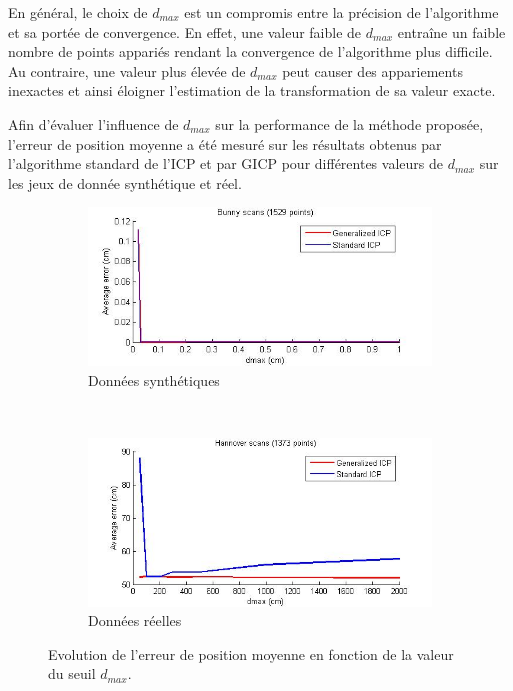 En général, le choix de $d_{max}$ est un compromis entre la précision de l'algorithme et sa portée de convergence. En effet, une valeur faible de $d_{max}$ entraîne un faible nombre de points appariés rendant la convergence de l'algorithme plus difficile. Au contraire, une valeur plus élevée de $d_{max}$ peut causer des appariements inexactes et ainsi éloigner l'estimation de la transformation de sa valeur exacte. 

Afin d'évaluer l'influence de $d_{max}$ sur la performance de la méthode proposée, l'erreur de position moyenne a été mesuré sur les résultats obtenus par l'algorithme standard de l'ICP et par GICP pour différentes valeurs de $d_{max}$ sur les jeux de donnée  synthétique et réel.\\


\begin{figure}[!h]
   \centering
   \begin{subfigure}[t]{.5\linewidth}
     \centering
     \includegraphics[scale=0.4]{Images/Resultats/bunny_evol_error_dmax.jpg}
     \caption{Données synthétiques}
     \label{fig:err_dmax_synthe}
   \end{subfigure}%
   ~
   \begin{subfigure}[t]{.5\linewidth}
     \centering
     \includegraphics[scale=0.4]{Images/Resultats/hannover_evol_error_dmax.jpg}
     \caption{Données réelles}
     \label{fig:err_dmax_reelle}
   \end{subfigure}
   
   \caption{Evolution de l'erreur de position moyenne en fonction de la valeur du seuil $d_{max}$.}
   \label{fig:err_dmax}
\end{figure}



